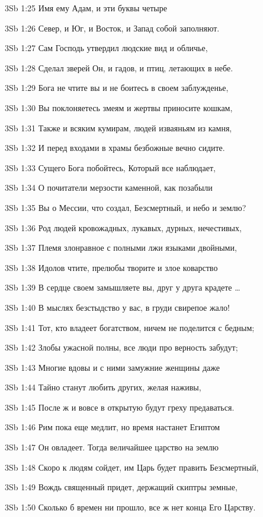 \vs 3Sb 1:25 Имя ему  Адам, и эти буквы четыре

\vs 3Sb 1:26 Север, и Юг, и Восток, и Запад собой заполняют. 

\vs 3Sb 1:27 Сам Господь утвердил людские вид и обличье, 

\vs 3Sb 1:28 Сделал зверей Он, и гадов, и птиц, летающих в небе.

\vs 3Sb 1:29 Бога не чтите вы и не боитесь в своем заблужденье,

\vs 3Sb 1:30 Вы поклоняетесь змеям и жертвы приносите кошкам, 

\vs 3Sb 1:31 Также и всяким кумирам, людей изваяньям из камня, 

\vs 3Sb 1:32 И перед входами в храмы безбожные вечно сидите. 

\vs 3Sb 1:33 Сущего Бога побойтесь, Который все наблюдает, 

\vs 3Sb 1:34 О почитатели мерзости каменной, как позабыли

\vs 3Sb 1:35 Вы о Мессии, что создал, Безсмертный, и небо и землю? 

\vs 3Sb 1:36 Род людей кровожадных, лукавых, дурных, нечестивых, 

\vs 3Sb 1:37 Племя злонравное с полными лжи языками двойными, 

\vs 3Sb 1:38 Идолов чтите, прелюбы творите и злое коварство 

\vs 3Sb 1:39 В сердце своем замышляете вы, друг у друга крадете \ldots

\vs 3Sb 1:40 В мыслях безстыдство у вас, в груди  свирепое жало! 

\vs 3Sb 1:41 Тот, кто владеет богатством, ничем не поделится с бедным; 

\vs 3Sb 1:42 Злобы ужасной полны, все люди про верность забудут; 

\vs 3Sb 1:43 Многие вдовы и с ними замужние женщины даже 

\vs 3Sb 1:44 Тайно станут любить других, желая наживы,

\vs 3Sb 1:45 После ж и вовсе в открытую будут греху предаваться.

\vs 3Sb 1:46 Рим пока еще медлит, но время настанет  Египтом 

\vs 3Sb 1:47 Он овладеет. Тогда величайшее царство на землю 

\vs 3Sb 1:48 Скоро к людям сойдет, им Царь будет править Безсмертный, 

\vs 3Sb 1:49 Вождь священный придет, держащий скиптры земные,

\vs 3Sb 1:50 Сколько б времен ни прошло, все ж нет конца Его Царству. 

